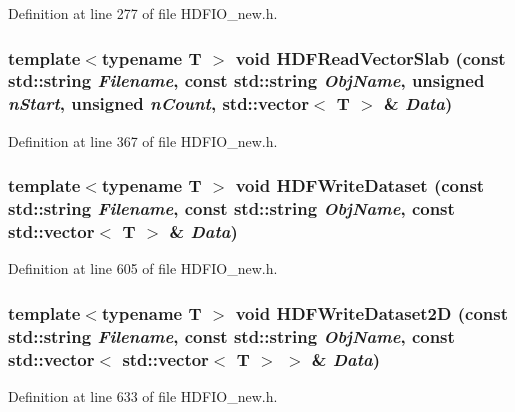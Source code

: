Definition at line 277 of file HDFIO\_\-new.h.

\subsubsection[{HDFReadVectorSlab}]{\setlength{\rightskip}{0pt plus 5cm}template$<$typename T $>$ void HDFReadVectorSlab (const std::string {\em Filename}, \/  const std::string {\em ObjName}, \/  unsigned {\em nStart}, \/  unsigned {\em nCount}, \/  std::vector$<$ T $>$ \& {\em Data})}\label{HDFIO__new_8h_a3a874f1791e49402424d5067b1d42182}


Definition at line 367 of file HDFIO\_\-new.h.

\subsubsection[{HDFWriteDataset}]{\setlength{\rightskip}{0pt plus 5cm}template$<$typename T $>$ void HDFWriteDataset (const std::string {\em Filename}, \/  const std::string {\em ObjName}, \/  const std::vector$<$ T $>$ \& {\em Data})}\label{HDFIO__new_8h_aa73a8d13c03b62b0a709d7e7248f0ca7}


Definition at line 605 of file HDFIO\_\-new.h.

\subsubsection[{HDFWriteDataset2D}]{\setlength{\rightskip}{0pt plus 5cm}template$<$typename T $>$ void HDFWriteDataset2D (const std::string {\em Filename}, \/  const std::string {\em ObjName}, \/  const std::vector$<$ std::vector$<$ T $>$ $>$ \& {\em Data})}\label{HDFIO__new_8h_a913817631ba066e8204abbacb6eb6b9f}


Definition at line 633 of file HDFIO\_\-new.h.

